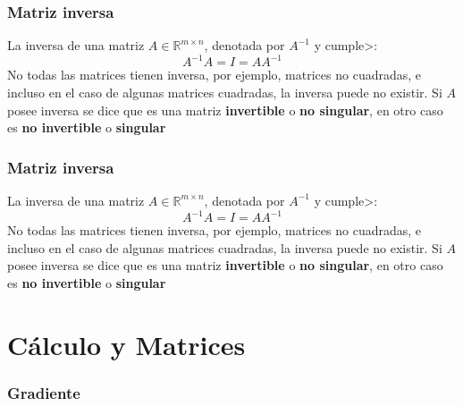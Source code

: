 \documentclass[10pt]{beamer}
\begin{document}
\begin{frame}
    \frametitle{Matriz inversa}
    La inversa de una matriz $A \in \mathbb{R}^{m\times n}$, denotada por $A^{-1}$ y cumple>:
    \begin{equation}
        A^{-1}A = I = AA^{-1}
    \end{equation}
    No todas las matrices tienen inversa, por ejemplo, matrices no cuadradas, e incluso en el caso 
    de algunas matrices cuadradas, la inversa puede no existir. Si $A$ posee inversa se dice que 
    es una matriz \textbf{invertible} o \textbf{no singular}, en otro caso es \textbf{no invertible}
    o \textbf{singular}
\end{frame}

\begin{frame}
    \frametitle{Matriz inversa}
    La inversa de una matriz $A \in \mathbb{R}^{m\times n}$, denotada por $A^{-1}$ y cumple>:
    \begin{equation}
        A^{-1}A = I = AA^{-1}
    \end{equation}
    No todas las matrices tienen inversa, por ejemplo, matrices no cuadradas, e incluso en el caso 
    de algunas matrices cuadradas, la inversa puede no existir. Si $A$ posee inversa se dice que 
    es una matriz \textbf{invertible} o \textbf{no singular}, en otro caso es \textbf{no invertible}
    o \textbf{singular}
\end{frame}


\section{Cálculo y Matrices}
\begin{frame}
    \frametitle{Gradiente}
    
\end{frame}
\end{document}
